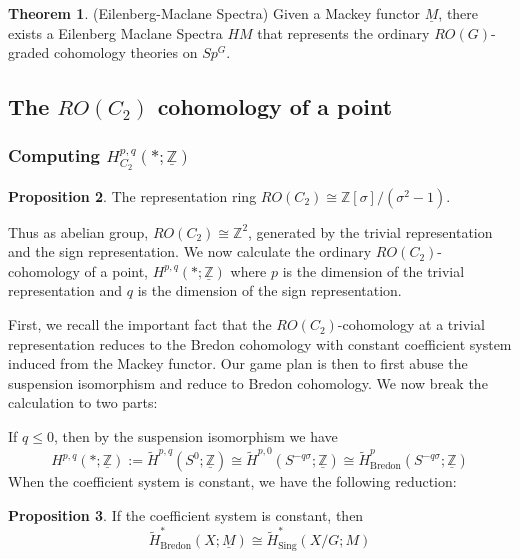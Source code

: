 \documentclass{article}
\theoremstyle{definition}
\newtheorem{theorem}{Theorem}[section] %
\newtheorem{proposition}[theorem]{Proposition}
\begin{document}
\begin{tcolorbox}[colback=red!5!white,colframe=red!30!white]
\begin{theorem}
(Eilenberg-Maclane Spectra) Given a Mackey functor $\underline{M}$, there exists a Eilenberg Maclane Spectra $HM$ that represents the ordinary $RO(G)$-graded cohomology theories on $Sp^G$. 
\end{theorem}
\end{tcolorbox}


\subsection{The $RO(C_2)$ cohomology of a point}
\subsubsection{Computing $H^{p,q}_{C_2}(*; \underline{\mathbb{Z}})$}

\begin{tcolorbox}[colback=blue!5!white,colframe=blue!30!white]
\begin{proposition}
The representation ring $RO(C_2)\cong \mathbb{Z}[\sigma]/(\sigma^2-1)$. 
\end{proposition}
\end{tcolorbox}
Thus as abelian group, $RO(C_2)\cong \mathbb{Z}^2$, generated by the trivial representation and the sign representation. We now calculate the ordinary $RO(C_2)$-cohomology of a point, $H^{p,q}(*;\underline{\mathbb{Z}})$ where $p$ is the dimension of the trivial representation
and $q$ is the dimension of the sign representation. 

First, we recall the important fact that the $RO(C_2)$-cohomology at a trivial representation reduces to the Bredon cohomology with constant coefficient system induced from the Mackey functor. Our game plan is then to first abuse the suspension isomorphism and reduce to Bredon cohomology. We now break the calculation to two parts:

If $q\leq 0$, then by the suspension isomorphism we have $$H^{p,q}(*;\underline{\mathbb{Z}}):= \tilde{H}^{p,q}(S^0;\underline{\mathbb{Z}})\cong \tilde{H}^{p,0}(S^{-q\sigma};\underline{\mathbb{Z}})\cong \tilde{H}^{p}_{\textrm{Bredon}}(S^{-q\sigma};\underline{\mathbb{Z}})$$
When the coefficient system is constant, we have the following reduction:

\begin{tcolorbox}[colback=blue!5!white,colframe=blue!30!white]
\begin{proposition}
If the coefficient system is constant, then 
\[\tilde{H}^*_{\textrm{Bredon}}(X; \underline{M})\cong \tilde{H}^*_{\textrm{Sing}}(X/G; M)\]
\end{proposition}
\end{tcolorbox}
\end{document}
